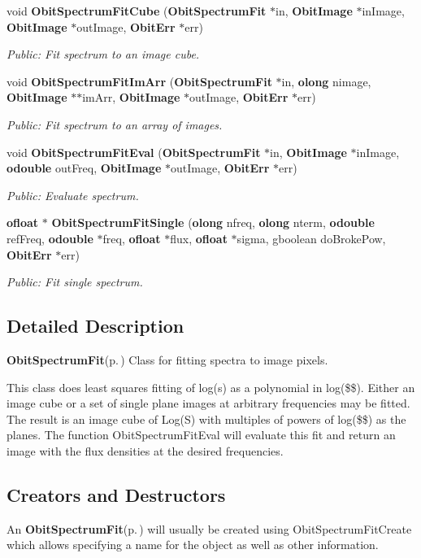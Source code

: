 \begin{CompactItemize}
void {\bf Obit\-Spectrum\-Fit\-Cube} ({\bf Obit\-Spectrum\-Fit} $\ast$in, {\bf Obit\-Image} $\ast$in\-Image, {\bf Obit\-Image} $\ast$out\-Image, {\bf Obit\-Err} $\ast$err)
\begin{CompactList}\small\item\em Public: Fit spectrum to an image cube. \item\end{CompactList}\item 
void {\bf Obit\-Spectrum\-Fit\-Im\-Arr} ({\bf Obit\-Spectrum\-Fit} $\ast$in, {\bf olong} nimage, {\bf Obit\-Image} $\ast$$\ast$im\-Arr, {\bf Obit\-Image} $\ast$out\-Image, {\bf Obit\-Err} $\ast$err)
\begin{CompactList}\small\item\em Public: Fit spectrum to an array of images. \item\end{CompactList}\item 
void {\bf Obit\-Spectrum\-Fit\-Eval} ({\bf Obit\-Spectrum\-Fit} $\ast$in, {\bf Obit\-Image} $\ast$in\-Image, {\bf odouble} out\-Freq, {\bf Obit\-Image} $\ast$out\-Image, {\bf Obit\-Err} $\ast$err)
\begin{CompactList}\small\item\em Public: Evaluate spectrum. \item\end{CompactList}\item 
{\bf ofloat} $\ast$ {\bf Obit\-Spectrum\-Fit\-Single} ({\bf olong} nfreq, {\bf olong} nterm, {\bf odouble} ref\-Freq, {\bf odouble} $\ast$freq, {\bf ofloat} $\ast$flux, {\bf ofloat} $\ast$sigma, gboolean do\-Broke\-Pow, {\bf Obit\-Err} $\ast$err)
\begin{CompactList}\small\item\em Public: Fit single spectrum. \item\end{CompactList}\end{CompactItemize}


\subsection{Detailed Description}
{\bf Obit\-Spectrum\-Fit}{\rm (p.\,\pageref{structObitSpectrumFit})} Class for fitting spectra to image pixels. 

This class does least squares fitting of log(s) as a polynomial in log(\$\$). Either an image cube or a set of single plane images at arbitrary frequencies may be fitted. The result is an image cube of Log(S) with multiples of powers of log(\$\$) as the planes. The function Obit\-Spectrum\-Fit\-Eval will evaluate this fit and return an image with the flux densities at the desired frequencies.\subsection{Creators and Destructors}\label{ObitSpectrumFit_8h_ObitSpectrumFitaccess}
An {\bf Obit\-Spectrum\-Fit}{\rm (p.\,\pageref{structObitSpectrumFit})} will usually be created using Obit\-Spectrum\-Fit\-Create which allows specifying a name for the object as well as other information.

